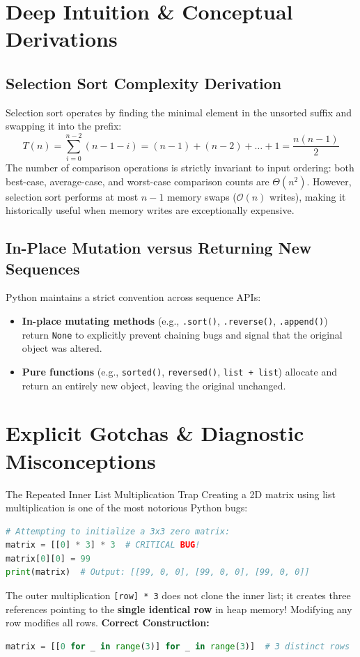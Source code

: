 \section{Deep Intuition \& Conceptual Derivations}

\subsection{Selection Sort Complexity Derivation}
Selection sort operates by finding the minimal element in the unsorted suffix and swapping it into the prefix:
\begin{equation}
T(n) = \sum_{i=0}^{n-2} (n - 1 - i) = (n - 1) + (n - 2) + \dots + 1 = \frac{n(n - 1)}{2}
\end{equation}
The number of comparison operations is strictly invariant to input ordering: both best-case, average-case, and worst-case comparison counts are $\Theta(n^2)$. However, selection sort performs at most $n - 1$ memory swaps ($\mathcal{O}(n)$ writes), making it historically useful when memory writes are exceptionally expensive.

\subsection{In-Place Mutation versus Returning New Sequences}
Python maintains a strict convention across sequence APIs:
\begin{itemize}
    \item \textbf{In-place mutating methods} (e.g., \texttt{.sort()}, \texttt{.reverse()}, \texttt{.append()}) return \texttt{None} to explicitly prevent chaining bugs and signal that the original object was altered.
    \item \textbf{Pure functions} (e.g., \texttt{sorted()}, \texttt{reversed()}, \texttt{list + list}) allocate and return an entirely new object, leaving the original unchanged.
\end{itemize}

\section{Explicit Gotchas \& Diagnostic Misconceptions}

\begin{trapbox}{The Repeated Inner List Multiplication Trap}
Creating a 2D matrix using list multiplication is one of the most notorious Python bugs:
\begin{lstlisting}[language=Python]
# Attempting to initialize a 3x3 zero matrix:
matrix = [[0] * 3] * 3  # CRITICAL BUG!
matrix[0][0] = 99
print(matrix)  # Output: [[99, 0, 0], [99, 0, 0], [99, 0, 0]]
\end{lstlisting}
The outer multiplication \texttt{[row] * 3} does not clone the inner list; it creates three references pointing to the \textbf{single identical row} in heap memory! Modifying any row modifies all rows.
\textbf{Correct Construction:}
\begin{lstlisting}[language=Python]
matrix = [[0 for _ in range(3)] for _ in range(3)]  # 3 distinct rows
\end{lstlisting}
\end{trapbox}

